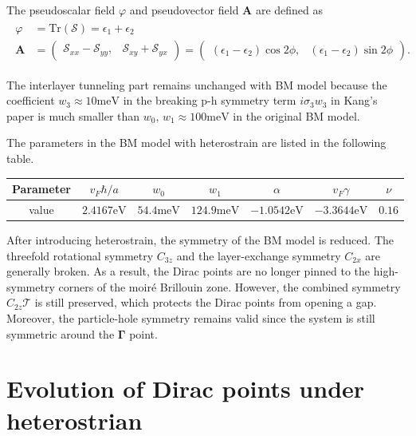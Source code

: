 \documentclass[10pt, oneside]{article}
\newcommand{\vph}{\varphi}
\newcommand{\mr}[1]{\mathrm{#1}}
\newcommand{\p}[1]{\left(#1\right)}
\begin{document}
The pseudoscalar field \(\vph\) and pseudovector field \(\bm{A}\) are defined as
\begin{align}
	\begin{split}
		\vph &= \mr{Tr}\p{\mathcal{S}} = \epsilon_1 + \epsilon_2 \\
	    \bm{A} &= \begin{pmatrix}
		    \mathcal{S}_{xx} - \mathcal{S}_{yy},&   \mathcal{S}_{xy} + \mathcal{S}_{yx}
	        \end{pmatrix}  = \begin{pmatrix}
		    \p{\epsilon_1 - \epsilon_2} \cos{2 \phi},&  \p{\epsilon_1 - \epsilon_2} \sin{2 \phi}
	        \end{pmatrix}.
	\end{split}
\end{align}

The interlayer tunneling part remains unchanged with BM model because the coefficient \(w_{3} \approx 10 \mr{meV}\) in the breaking p-h symmetry term \(i \sigma_3 w_3\) in Kang's paper is much smaller than \(w_0, \, w_1 \approx 100 \mr{meV}\) in the original BM model. 

The parameters in the BM model with heterostrain are listed in the following table.
\begin{table}[h!]
	\centering
	\begin{tabular}{c c c c c c c}
		\toprule
		Parameter & \(v_{F} \hbar/a\) & \(w_0\) & \(w_1\) & \(\alpha\) & \(v_{F} \gamma\) & \(\nu\) \\
		\midrule
		value & \(2.4167  \mr{eV}\) & \(54.4  \mr{meV}\) &  \(124.9 \mr{meV}\) &  \(-1.0542 \mr{eV}\) &  \( -3.3644 \mr{eV}\) & \(0.16\) \\
		\bottomrule
	\end{tabular}
\end{table}

After introducing heterostrain, the symmetry of the BM model is reduced. The threefold rotational symmetry \(C_{3z}\) and the layer-exchange symmetry \(C_{2x}\) are generally broken. As a result, the Dirac points are no longer pinned to the high-symmetry corners of the moir\'e Brillouin zone. However, the combined symmetry \(C_{2z}\mathcal{T}\) is still preserved, which protects the Dirac points from opening a gap. Moreover, the particle-hole symmetry remains valid since the system is still symmetric around the \(\bm{\Gamma}\) point.


\section{Evolution of Dirac points under heterostrian}
\end{document}
